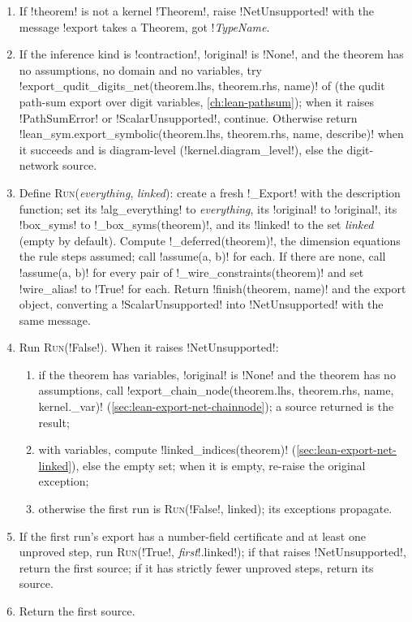 {\begin{algorithm}[\py!export!]\label{alg:lean-export-net-export}
\begin{enumerate}
\item If \py!theorem! is not a kernel \py!Theorem!, raise \py!NetUnsupported! with the message
  \code!export takes a Theorem, got !\textit{TypeName}.
\item If the inference kind is \code!contraction!, \py!original! is \py!None!, and the theorem
  has no assumptions, no domain and no variables, try
  \py!export_qudit_digits_net(theorem.lhs, theorem.rhs, name)! of
   (the qudit path-sum export over digit variables,
  \cref{ch:lean-pathsum}); when it raises \py!PathSumError! or \py!ScalarUnsupported!,
  continue. Otherwise return
  \py!lean_sym.export_symbolic(theorem.lhs, theorem.rhs, name, describe)! when it succeeds and is diagram-level (\py!kernel.diagram_level!), else the
  digit-network source.
\item Define \textsc{Run}(\textit{everything}, \textit{linked}): create a fresh \py!_Export! with
  the description function; set its \py!alg_everything! to \textit{everything}, its
  \py!original! to \py!original!, its \py!box_syms! to \py!_box_syms(theorem)!, and its
  \py!linked! to the set \textit{linked} (empty by default). Compute
  \py!_deferred(theorem)!, the dimension equations the rule steps assumed; call
  \py!assume(a, b)! for each. If there are none, call \py!assume(a, b)! for every pair of
  \py!_wire_constraints(theorem)! and set \py!wire_alias! to \py!True! for each. Return
  \py!finish(theorem, name)! and the export object, converting a \py!ScalarUnsupported! into
  \py!NetUnsupported! with the same message.
\item Run \textsc{Run}(\py!False!). When it raises \py!NetUnsupported!:
  \begin{enumerate}
  \item if the theorem has variables, \py!original! is \py!None! and the theorem has no
    assumptions, call \py!export_chain_node(theorem.lhs, theorem.rhs, name, kernel._var)!
    (\cref{sec:lean-export-net-chainnode}); a source returned is the result;
  \item with variables, compute \py!linked_indices(theorem)!
    (\cref{sec:lean-export-net-linked}), else the empty set; when it is empty, re-raise the
    original exception;
  \item otherwise the first run is \textsc{Run}(\py!False!, linked); its exceptions propagate.
  \end{enumerate}
\item If the first run's export has a number-field certificate and at least one unproved step,
  run \textsc{Run}(\py!True!, \textit{first}\py!.linked!); if that raises \py!NetUnsupported!,
  return the first source; if it has strictly fewer unproved steps, return its source.
\item Return the first source.
\end{enumerate}
\end{algorithm}

}
